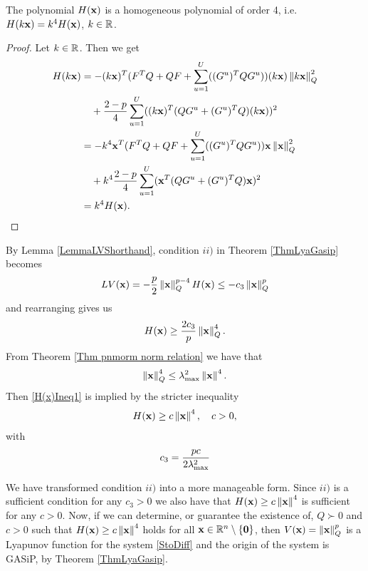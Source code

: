 \documentclass[a4paper,12pt,twoside,BCOR=10mm]{scrbook}
\begin{document}
\begin{lemma}\label{LemmaH(x)Homogeneous}
The polynomial $H(\mathbf{x})$ is a homogeneous polynomial of order 4, i.e. $H(k\mathbf{x}) = k^4H(\mathbf{x})$, $k\in\mathbb{R}^{}$.
\end{lemma}
\begin{proof}
Let $k\in\mathbb{R}^{}$. Then we get
\begin{align*}
\begin{split}
    H(k\mathbf{x}) &= -(k\mathbf{x})^T(F^TQ + QF + \sum_{u=1}^U((G^u)^TQG^u))(k\mathbf{x})\left\lVert k\mathbf{x}\right\rVert_{Q}^{2}\\
    &\quad + \frac{2 - p}{4}\sum_{u=1}^U((k\mathbf{x})^T (QG^u + (G^u)^TQ)(k\mathbf{x}))^2\\
    &= -k^4\mathbf{x}^T(F^TQ + QF +\sum_{u = 1}^U ((G^u)^T Q G^u))\mathbf{x}\left\lVert\mathbf{x}\right\rVert_{Q}^{2}\\
    &\quad + k^4 \frac{2 - p}{4}\sum_{u=1}^U(\mathbf{x}^T(QG^u + (G^u)^TQ)\mathbf{x})^2\\
    &= k^4H(\mathbf{x}).
\end{split}
\end{align*}
\end{proof}
By Lemma \ref{LemmaLVShorthand}, condition $ii)$ in Theorem \ref{ThmLyaGasip} becomes
\begin{align*}
    LV(\mathbf{x}) = -\frac{p}{2}\left\lVert\mathbf{x}\right\rVert_{Q}^{p - 4}H(\mathbf{x}) \leq -c_3\left\lVert\mathbf{x}\right\rVert_Q^p
\end{align*}
and rearranging gives us
\begin{align}\label{H(x)Ineq1}
    H(\mathbf{x}) \geq \frac{2c_3}{p}\left\lVert\mathbf{x}\right\rVert_{Q}^{4}.
\end{align}
From Theorem \ref{Thm pnmorm norm relation} we have that
\begin{align*}
    \left\lVert\mathbf{x}\right\rVert_{Q}^{4} \leq \lambda_{\max}^2 \left\lVert\mathbf{x}\right\rVert^4.
\end{align*}
Then \eqref{H(x)Ineq1} is implied by the stricter inequality
\begin{align}\label{H(x)Ineq3}
    H(\mathbf{x}) \geq c\left\lVert\mathbf{x}\right\rVert_{}^{4}, \quad c > 0,
\end{align}
with
\begin{align*}
    c_3 = \frac{pc}{2 \lambda_{\max}^2}
\end{align*}

We have transformed condition $ii)$ into a more manageable form. Since $ii)$ is a sufficient condition for any $c_3 > 0$ we also have that $H(\mathbf{x}) \geq c\left\lVert\mathbf{x}\right\rVert_{}^{4}$ is sufficient for any $c > 0$. Now, if we can determine, or guarantee the existence of, $Q \succ 0$ and $c > 0$ such that $H(\mathbf{x}) \geq c\left\lVert\mathbf{x}\right\rVert_{}^{4}$ holds for all $\mathbf{x} \in \mathbb{R}^{n}\setminus \{\mathbf{0}\}$, then $V(\mathbf{x}) = \left\lVert\mathbf{x}\right\rVert_{Q}^{p}$ is a Lyapunov function for the system \eqref{StoDiff} and the origin of the system is GASiP, by Theorem \ref{ThmLyaGasip}.
\end{document}
